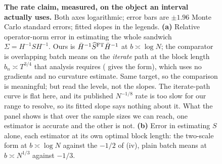 \begin{figure}[tbp]
\centering
{}
\caption{\textbf{The rate claim, measured, on the object an interval actually uses.}
Both axes logarithmic; error bars are $\pm1.96$ Monte Carlo standard errors; fitted slopes in
the legends. \textbf{(a)} Relative operator-norm error in estimating the whole sandwich
$\Sigma=H^{-1}SH^{-1}$. Ours is $\bar{H}^{-1}\widehat{S}^{\mathrm{FT}}\bar{H}^{-1}$ at $b\asymp\log N$; the comparator is
overlapping batch means on the \emph{iterate} path at the block length $b_n\asymp T^{3/4}$ that
analysis requires ( gives the form), which uses no gradients and no curvature
estimate. Same target, so the comparison is meaningful; but read the levels, not the slopes. The
iterate-path curve is flat here, and its published $N^{-1/8}$ rate is too slow for our range to
resolve, so its fitted slope says nothing about it. What the panel shows is that over the sample
sizes we can reach, one estimator is accurate and the other is not. \textbf{(b)} Error in estimating $S$ alone, each estimator at its own optimal block
length: the two-scale form at $b\asymp\log N$ against the $-1/2$ of (iv), plain
batch means at $b\asymp N^{1/3}$ against $-1/3$.}
\label{fig:lrvrate}
\end{figure}
